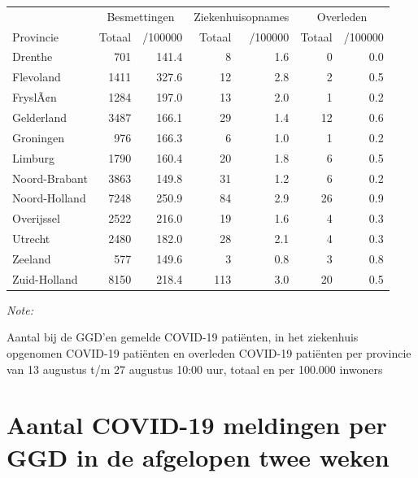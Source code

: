 \documentclass[
  english,
  man,floatsintext]{apa6}
\begin{document}
\begin{table}
\centering
\begin{threeparttable}
\begin{tabular}{lrrrrrr}
\toprule
\multicolumn{1}{c}{ } & \multicolumn{2}{c}{Besmettingen} & \multicolumn{2}{c}{Ziekenhuisopnames} & \multicolumn{2}{c}{Overleden} \\
\cmidrule(l{3pt}r{3pt}){2-3} \cmidrule(l{3pt}r{3pt}){4-5} \cmidrule(l{3pt}r{3pt}){6-7}
Provincie & Totaal & /100000 & Totaal & /100000 & Totaal & /100000\\
\midrule
Drenthe & 701 & 141.4 & 8 & 1.6 & 0 & 0.0\\
Flevoland & 1411 & 327.6 & 12 & 2.8 & 2 & 0.5\\
FryslÃ¢n & 1284 & 197.0 & 13 & 2.0 & 1 & 0.2\\
Gelderland & 3487 & 166.1 & 29 & 1.4 & 12 & 0.6\\
Groningen & 976 & 166.3 & 6 & 1.0 & 1 & 0.2\\
Limburg & 1790 & 160.4 & 20 & 1.8 & 6 & 0.5\\
Noord-Brabant & 3863 & 149.8 & 31 & 1.2 & 6 & 0.2\\
Noord-Holland & 7248 & 250.9 & 84 & 2.9 & 26 & 0.9\\
Overijssel & 2522 & 216.0 & 19 & 1.6 & 4 & 0.3\\
Utrecht & 2480 & 182.0 & 28 & 2.1 & 4 & 0.3\\
Zeeland & 577 & 149.6 & 3 & 0.8 & 3 & 0.8\\
Zuid-Holland & 8150 & 218.4 & 113 & 3.0 & 20 & 0.5\\
\bottomrule
\end{tabular}
\begin{tablenotes}
\item \textit{Note: } 
\item Aantal bij de GGD’en gemelde COVID-19 patiënten, in het ziekenhuis opgenomen COVID-19 patiënten en overleden COVID-19 patiënten per provincie van 13 augustus t/m 27 augustus 10:00 uur, totaal en per 100.000 inwoners
\end{tablenotes}
\end{threeparttable}
\end{table}

\newpage

\hypertarget{aantal-covid-19-meldingen-per-ggd-in-de-afgelopen-twee-weken}{%
\section{Aantal COVID-19 meldingen per GGD in de afgelopen twee weken}\label{aantal-covid-19-meldingen-per-ggd-in-de-afgelopen-twee-weken}}
\end{document}
